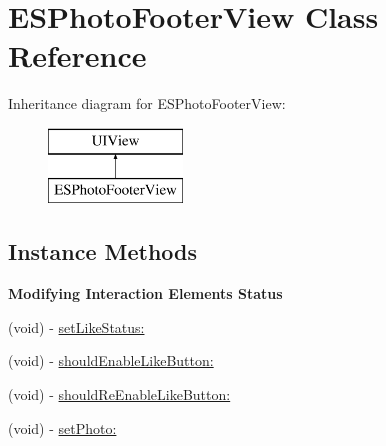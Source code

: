 \hypertarget{interface_e_s_photo_footer_view}{}\section{E\+S\+Photo\+Footer\+View Class Reference}
\label{interface_e_s_photo_footer_view}
Inheritance diagram for E\+S\+Photo\+Footer\+View\+:\begin{figure}[H]
\begin{center}
\leavevmode
\includegraphics[height=2.000000cm]{interface_e_s_photo_footer_view}
\end{center}
\end{figure}
\subsection*{Instance Methods}
\begin{Indent}{\bf Modifying Interaction Elements Status}\par
\begin{DoxyCompactItemize}
\item 
(void) -\/ \hyperlink{interface_e_s_photo_footer_view_afb5cc2e86af7d4f0d38a35613ac67c44}{set\+Like\+Status\+:}
\item 
(void) -\/ \hyperlink{interface_e_s_photo_footer_view_adde05887ae9fb306a0a0a1fc9ab70b6c}{should\+Enable\+Like\+Button\+:}
\item 
(void) -\/ \hyperlink{interface_e_s_photo_footer_view_ae0aa6f099b8e9b9de114465e786196d4}{should\+Re\+Enable\+Like\+Button\+:}
\item 
(void) -\/ \hyperlink{interface_e_s_photo_footer_view_a7fd642b707a3a650286992cb3be29064}{set\+Photo\+:}
\end{DoxyCompactItemize}
\end{Indent}
